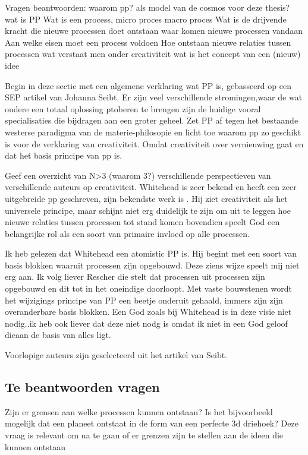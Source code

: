 \documentclass[a4paper]{Thesis}
\begin{document}
Vragen beantwoorden:
waarom pp? als model van de cosmos voor deze thesis?
wat is PP
Wat is een process, micro proces macro proces
Wat is de drijvende kracht die nieuwe processen doet ontstaan
waar komen nieuwe processen vandaan
Aan welke eisen moet een process voldoen
Hoe ontstaan nieuwe relaties tussen processen
wat verstaat men onder creativiteit
wat is het concept van een (nieuw) idee

Begin in deze sectie met een algemene verklaring wat PP is, gebasseerd op een SEP artikel van Johanna Seibt. Er zijn veel verschillende stromingen,waar de wat oudere een totaal oplossing ptoberen te brengen zijn de huidige vooral specialisaties die bijdragen aan een groter geheel.
Zet PP af tegen het bestaande westerse paradigma van de materie-philosopie en licht toe waarom pp zo geschikt is voor de verklaring van creativiteit. Omdat creativiteit over vernieuwing gaat en dat het basis principe van pp is.

Geef een overzicht van N>3 (waarom 3?) verschillende perspectieven van verschillende auteurs op creativiteit. Whitehead is zeer bekend en heeft een zeer uitgebreide pp geschreven, zijn bekendste werk is \cite{whitehead1929process}. Hij ziet creativiteit als het universele principe, maar schijnt niet erg duidelijk te zijn om uit te leggen hoe nieuwe relaties tussen processen tot stand komen bovendien speelt God een belangrijke rol als een soort van primaire invloed op alle processen.

Ik heb gelezen dat Whitehead een atomistic PP is. Hij begint met een soort van basis blokken waaruit processen zijn opgebouwd. Deze ziens wijze speelt mij niet erg aan. Ik volg liever Rescher die stelt dat processen uit processen zijn opgebouwd en dit tot in het oneindige doorloopt. Met vaste bouwstenen wordt het wijzigings principe van PP een beetje onderuit gehaald, immers zijn zijn overanderbare basis blokken. Een God zoals bij Whitehead is in deze visie niet nodig..ik heb ook liever dat deze niet nodg is omdat ik niet in een God geloof dieaan de basis van alles ligt.

Voorlopige auteurs zijn geselecteerd uit het artikel van Seibt.

\subsection{Te beantwoorden vragen}
Zijn er grensen aan welke processen kunnen ontstaan? Is het bijvoorbeeld mogelijk dat een planeet ontstaat in de form van een perfecte 3d driehoek?
Deze vraag is relevant om na te gaan of er grenzen zijn te stellen aan de ideen die kunnen ontstaan
\end{document}
